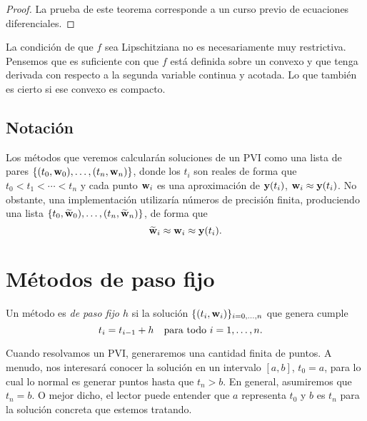 \begin{proof}
    La prueba de este teorema corresponde a
    un curso previo de ecuaciones diferenciales.
\end{proof}

\begin{remark}
    La condición de que $f$ sea Lipschitziana no es necesariamente
    muy restrictiva.
    Pensemos que es suficiente con que $f$ está definida sobre un convexo y
    que tenga derivada con respecto a la segunda variable continua y acotada.
    Lo que también es cierto si ese convexo es compacto.
\end{remark}

\subsection{Notación}

Los métodos que veremos calcularán soluciones de un PVI
como una lista de pares $\{(t_0, \vb{w}_0), \ldots, (t_n, \vb{w}_n)\}$,
donde los $t_i$ son reales de forma que $t_0 < t_1 < \cdots < t_n$
y cada punto $\vb{w}_i$ es una aproximación de $\vb{y}(t_i)$,
$\vb{w}_i \approx \vb{y}(t_i)$.
No obstante, una implementación utilizaría números de precisión finita,
produciendo una lista $\{t_0, \vb{\widetilde{w}}_0), \ldots, (t_n, \vb{\widetilde{w}}_n)\}$,
de forma que
\begin{equation*}
    \vb{\widetilde{w}}_i \approx \vb{w}_i \approx \vb{y}(t_i).
\end{equation*}

\section{Métodos de paso fijo}

\begin{definition}
    Un método es \emph{de paso fijo $h$} si la solución
    $\{(t_i, \vb{w}_i)\}_{i = 0,\ldots,n}$ que genera cumple
    \begin{equation*}
        t_i = t_{i-1} + h \qq{para todo $i = 1,\ldots,n$.}
    \end{equation*}
\end{definition}

Cuando resolvamos un PVI, generaremos una cantidad finita de puntos.
A menudo, nos interesará conocer la solución en un intervalo $[a, b]$,
$t_0 = a$,
para lo cual lo normal es generar puntos hasta que $t_n > b$.
En general, asumiremos que $t_n = b$.
O mejor dicho, el lector puede entender que $a$ representa $t_0$
y $b$ es $t_n$ para la solución concreta que estemos tratando.

